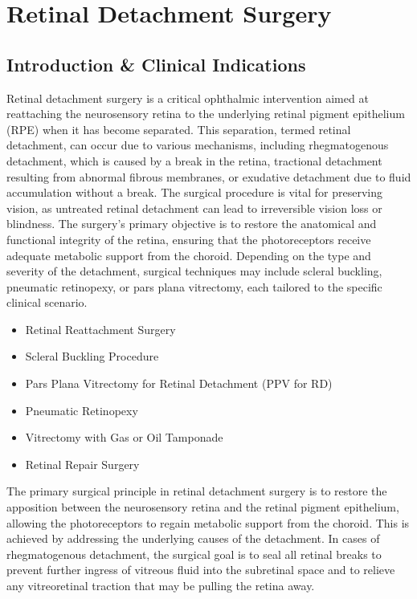 \chapter{Retinal Detachment Surgery}

\section*{Introduction \& Clinical Indications}
Retinal detachment surgery is a critical ophthalmic intervention aimed at reattaching the neurosensory retina to the underlying retinal pigment epithelium (RPE) when it has become separated. This separation, termed retinal detachment, can occur due to various mechanisms, including rhegmatogenous detachment, which is caused by a break in the retina, tractional detachment resulting from abnormal fibrous membranes, or exudative detachment due to fluid accumulation without a break. The surgical procedure is vital for preserving vision, as untreated retinal detachment can lead to irreversible vision loss or blindness. The surgery's primary objective is to restore the anatomical and functional integrity of the retina, ensuring that the photoreceptors receive adequate metabolic support from the choroid. Depending on the type and severity of the detachment, surgical techniques may include scleral buckling, pneumatic retinopexy, or pars plana vitrectomy, each tailored to the specific clinical scenario.

\begin{itemize}
  \item Retinal Reattachment Surgery
  \item Scleral Buckling Procedure
  \item Pars Plana Vitrectomy for Retinal Detachment (PPV for RD)
  \item Pneumatic Retinopexy
  \item Vitrectomy with Gas or Oil Tamponade
  \item Retinal Repair Surgery
\end{itemize}

The primary surgical principle in retinal detachment surgery is to restore the apposition between the neurosensory retina and the retinal pigment epithelium, allowing the photoreceptors to regain metabolic support from the choroid. This is achieved by addressing the underlying causes of the detachment. In cases of rhegmatogenous detachment, the surgical goal is to seal all retinal breaks to prevent further ingress of vitreous fluid into the subretinal space and to relieve any vitreoretinal traction that may be pulling the retina away.

